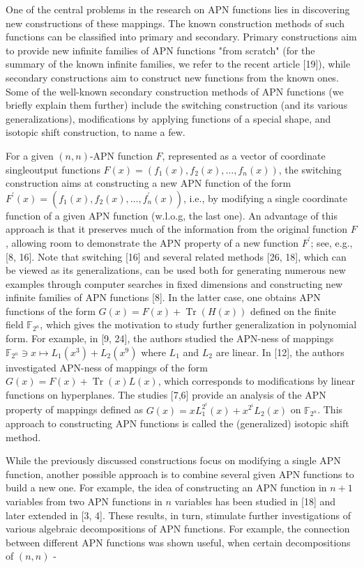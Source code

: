 \documentclass[10pt]{article}
\begin{document}
One of the central problems in the research on APN functions lies in discovering new constructions of these mappings. The known construction methods of such functions can be classified into primary and secondary. Primary constructions aim to provide new infinite families of APN functions "from scratch" (for the summary of the known infinite families, we refer to the recent article [19]), while secondary constructions aim to construct new functions from the known ones. Some of the well-known secondary construction methods of APN functions (we briefly explain them further) include the switching construction (and its various generalizations), modifications by applying functions of a special shape, and isotopic shift construction, to name a few.

For a given $(n, n)$-APN function $F$, represented as a vector of coordinate singleoutput functions $F(x)=\left(f_{1}(x), f_{2}(x), \ldots, f_{n}(x)\right)$, the switching construction aims at constructing a new APN function of the form $F^{\prime}(x)=\left(f_{1}(x), f_{2}(x), \ldots, f_{n}^{\prime}(x)\right)$, i.e., by modifying a single coordinate function of a given APN function (w.l.o.g, the last one). An advantage of this approach is that it preserves much of the information from the original function $F$, allowing room to demonstrate the APN property of a new function $F^{\prime}$; see, e.g., [8, 16]. Note that switching [16] and several related methods [26, 18], which can be viewed as its generalizations, can be used both for generating numerous new examples through computer searches in fixed dimensions and constructing new infinite families of APN functions [8]. In the latter case, one obtains APN functions of the form $G(x)=F(x)+\operatorname{Tr}(H(x))$ defined on the finite field $\mathbb{F}_{2^{n}}$, which gives the motivation to study further generalization in polynomial form. For example, in [9, 24], the authors studied the APN-ness of mappings $\mathbb{F}_{2^{n}} \ni x \mapsto L_{1}\left(x^{3}\right)+L_{2}\left(x^{9}\right)$ where $L_{1}$ and $L_{2}$ are linear. In [12], the authors investigated APN-ness of mappings of the form $G(x)=F(x)+\operatorname{Tr}(x) L(x)$, which corresponds to modifications by linear functions on hyperplanes. The studies [7,6] provide an analysis of the APN property of mappings defined as $G(x)=x L_{1}^{2^{i}}(x)+x^{2^{i}} L_{2}(x)$ on $\mathbb{F}_{2^{n}}$. This approach to constructing APN functions is called the (generalized) isotopic shift method.

While the previously discussed constructions focus on modifying a single APN function, another possible approach is to combine several given APN functions to build a new one. For example, the idea of constructing an APN function in $n+1$ variables from two APN functions in $n$ variables has been studied in [18] and later extended in [3, 4]. These results, in turn, stimulate further investigations of various algebraic decompositions of APN functions. For example, the connection between different APN functions was shown useful, when certain decompositions of $(n, n)$ -
\end{document}
